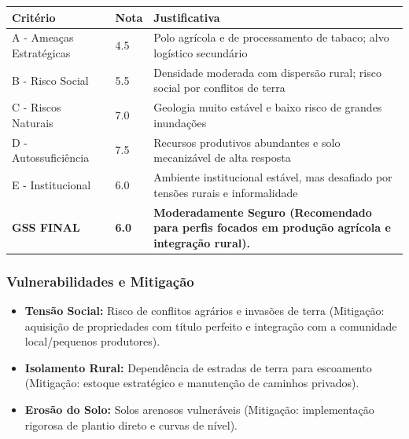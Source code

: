\begin{table}[ht!]
\small \begin{tabular}{p{3.0cm}p{0.8cm}p{6.0cm}} \toprule
\textbf{Critério} & \textbf{Nota} & \textbf{Justificativa} \\ \midrule
A - Ameaças Estratégicas & 4.5 & Polo agrícola e de processamento de tabaco; alvo logístico secundário \\
B - Risco Social & 5.5 & Densidade moderada com dispersão rural; risco social por conflitos de terra \\
C - Riscos Naturais & 7.0 & Geologia muito estável e baixo risco de grandes inundações \\
D - Autossuficiência & 7.5 & Recursos produtivos abundantes e solo mecanizável de alta resposta \\
E - Institucional & 6.0 & Ambiente institucional estável, mas desafiado por tensões rurais e informalidade \\
\midrule \textbf{GSS FINAL} & \textbf{6.0} & \textbf{Moderadamente Seguro (Recomendado para perfis focados em produção agrícola e integração rural).} \\ \bottomrule \end{tabular}
\end{table}
\subsubsection{Vulnerabilidades e
Mitigação}

\begin{itemize}
\tightlist
\item
  \textbf{Tensão Social:} Risco de conflitos agrários e invasões de
  terra (Mitigação: aquisição de propriedades com título perfeito e
  integração com a comunidade local/\allowbreak pequenos produtores).
\item
  \textbf{Isolamento Rural:} Dependência de estradas de terra para
  escoamento (Mitigação: estoque estratégico e manutenção de caminhos
  privados).
\item
  \textbf{Erosão do Solo:} Solos arenosos vulneráveis (Mitigação:
  implementação rigorosa de plantio direto e curvas de nível).
\end{itemize}

